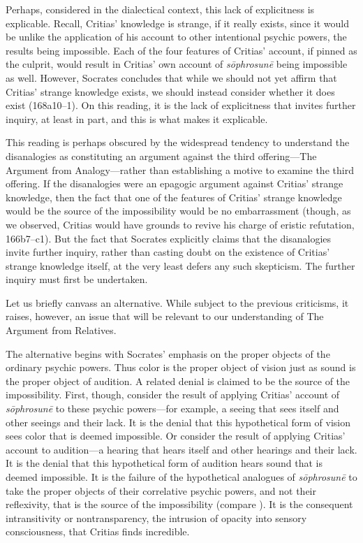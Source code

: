Perhaps, considered in the dialectical context, this lack of explicitness is explicable. Recall, Critias' knowledge is strange, if it really exists, since it would be unlike the application of his account to other intentional psychic powers, the results being impossible. Each of the four features of Critias' account, if pinned as the culprit, would result in Critias' own account of \emph{sōphrosunē} being impossible as well. However, Socrates concludes that while we should not yet affirm that Critias' strange knowledge exists, we should instead consider whether it does exist (168a10–1). On this reading, it is the lack of explicitness that invites further inquiry, at least in part, and this is what makes it explicable.

This reading is perhaps obscured by the widespread tendency to understand the disanalogies as constituting an argument against the third offering—The Argument from Analogy—rather than establishing a motive to examine the third offering. If the disanalogies were an epagogic argument against Critias' strange knowledge, then the fact that one of the features of Critias' strange knowledge would be the source of the impossibility would be no embarrassment (though, as we observed, Critias would have grounds to revive his charge of eristic refutation, 166b7–c1). But the fact that Socrates explicitly claims that the disanalogies invite further inquiry, rather than casting doubt on the existence of Critias' strange knowledge itself, at the very least defers any such skepticism. The further inquiry must first be undertaken.

Let us briefly canvass an alternative. While subject to the  previous criticisms, it raises, however, an issue that will be relevant to our understanding of The Argument from Relatives.

The alternative begins with Socrates' emphasis on the proper objects of the ordinary psychic powers. Thus color is the proper object of vision just as sound is the proper object of audition. A related denial is claimed to be the source of the impossibility. First, though, consider the result of applying Critias' account of \emph{sōphrosunē} to these psychic powers—for example, a seeing that sees itself and other seeings and their lack. It is the denial that this hypothetical form of vision sees color that is deemed impossible. Or consider the result of applying Critias' account to audition—a hearing that hears itself and other hearings and their lack. It is the denial that this hypothetical form of audition hears sound that is deemed impossible. It is the failure of the hypothetical analogues of \emph{sōphrosunē} to take the proper objects of their correlative psychic powers, and not their reflexivity, that is the source of the impossibility (compare \citealt[212–4]{Tuozzo:2011aa}). It is the consequent intransitivity or nontransparency, the intrusion of opacity into sensory consciousness, that Critias finds incredible.

